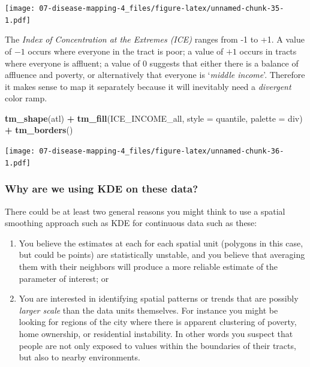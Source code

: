 \documentclass[
]{book}
\newenvironment{Shaded}{\begin{snugshade}}{\end{snugshade}}
\newcommand{\AttributeTok}[1]{\textcolor[rgb]{0.13,0.29,0.53}{#1}}
\newcommand{\FunctionTok}[1]{\textcolor[rgb]{0.13,0.29,0.53}{\textbf{#1}}}
\newcommand{\NormalTok}[1]{#1}
\newcommand{\SpecialCharTok}[1]{\textcolor[rgb]{0.81,0.36,0.00}{\textbf{#1}}}
\newcommand{\StringTok}[1]{\textcolor[rgb]{0.31,0.60,0.02}{#1}}
\providecommand{\tightlist}{%
  \setlength{\itemsep}{0pt}\setlength{\parskip}{0pt}}
\begin{document}
\texttt{[image: 07-disease-mapping-4\_files/figure-latex/unnamed-chunk-35-1.pdf]}

The \emph{Index of Concentration at the Extremes (ICE)} ranges from -1 to +1. A value of \(-1\) occurs where everyone in the tract is poor; a value of \(+1\) occurs in tracts where everyone is affluent; a value of \(0\) suggests that either there is a balance of affluence and poverty, or alternatively that everyone is `\emph{middle income}'. Therefore it makes sense to map it separately because it will inevitably need a \emph{divergent} color ramp.

\begin{Shaded}
\begin{Highlighting}[]
\FunctionTok{tm\_shape}\NormalTok{(atl) }\SpecialCharTok{+}
  \FunctionTok{tm\_fill}\NormalTok{(}\StringTok{\textquotesingle{}ICE\_INCOME\_all\textquotesingle{}}\NormalTok{,}
          \AttributeTok{style =} \StringTok{\textquotesingle{}quantile\textquotesingle{}}\NormalTok{,}
          \AttributeTok{palette =} \StringTok{\textquotesingle{}div\textquotesingle{}}\NormalTok{) }\SpecialCharTok{+}
  \FunctionTok{tm\_borders}\NormalTok{()}
\end{Highlighting}
\end{Shaded}

\texttt{[image: 07-disease-mapping-4\_files/figure-latex/unnamed-chunk-36-1.pdf]}

\hypertarget{why-are-we-using-kde-on-these-data}{%
\subsubsection{Why are we using KDE on these data?}\label{why-are-we-using-kde-on-these-data}}

There could be at least two general reasons you might think to use a spatial smoothing approach such as KDE for continuous data such as these:

\begin{enumerate}
\def\labelenumi{\arabic{enumi}.}
\tightlist
\item
  You believe the estimates at each for each spatial unit (polygons in this case, but could be points) are statistically unstable, and you believe that averaging them with their neighbors will produce a more reliable estimate of the parameter of interest; or
\item
  You are interested in identifying spatial patterns or trends that are possibly \emph{larger scale} than the data units themselves. For instance you might be looking for regions of the city where there is apparent clustering of poverty, home ownership, or residential instability. In other words you suspect that people are not only exposed to values within the boundaries of their tracts, but also to nearby environments.
\end{enumerate}
\end{document}
